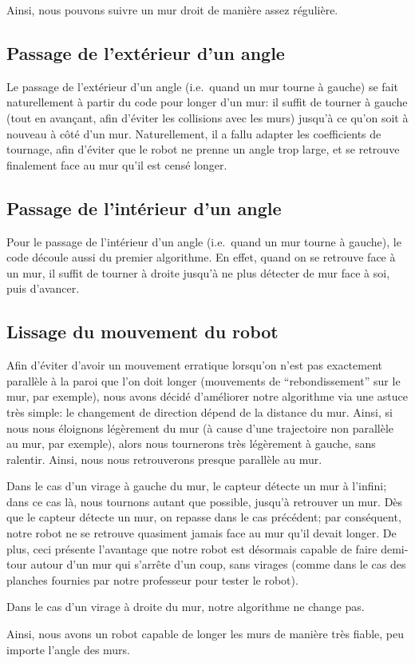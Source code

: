 \documentclass{scrartcl}
\begin{document}
Ainsi, nous pouvons suivre un mur droit de manière assez régulière.

\subsection{Passage de l'extérieur d'un angle}

Le passage de l'extérieur d'un angle (i.e.\ quand un mur tourne à
gauche) se fait naturellement à partir du code pour longer d'un mur:
il suffit de tourner à gauche (tout en avançant, afin d'éviter les
collisions avec les murs) jusqu'à ce qu'on soit à nouveau à côté d'un
mur. Naturellement, il a fallu adapter les coefficients de tournage,
afin d'éviter que le robot ne prenne un angle trop large, et se
retrouve finalement face au mur qu'il est censé longer.

\subsection{Passage de l'intérieur d'un angle}

Pour le passage de l'intérieur d'un angle (i.e.\ quand un mur tourne à
gauche), le code découle aussi du premier algorithme. En effet, quand
on se retrouve face à un mur, il suffit de tourner à droite jusqu'à ne
plus détecter de mur face à soi, puis d'avancer.

\subsection{Lissage du mouvement du robot}

Afin d'éviter d'avoir un mouvement erratique lorsqu'on n'est pas
exactement parallèle à la paroi que l'on doit longer (mouvements de
``rebondissement'' sur le mur, par exemple), nous avons décidé
d'améliorer notre algorithme via une astuce très simple: le changement de
direction dépend de la distance du mur. Ainsi, si nous nous éloignons
légèrement du mur (à cause d'une trajectoire non parallèle au mur, par
exemple), alors nous tournerons très légèrement à gauche, sans
ralentir. Ainsi, nous nous retrouverons presque parallèle au mur.

Dans le cas d'un virage à gauche du mur, le capteur détecte un mur à
l'infini; dans ce cas là, nous tournons autant que possible, jusqu'à
retrouver un mur. Dès que le capteur détecte un mur, on repasse dans
le cas précédent; par conséquent, notre robot ne se retrouve quasiment
jamais face au mur qu'il devait longer. De plus, ceci présente
l'avantage que notre robot est désormais capable de faire demi-tour
autour d'un mur qui s'arrête d'un coup, sans virages (comme dans le
cas des planches fournies par notre professeur pour tester le robot).

Dans le cas d'un virage à droite du mur, notre algorithme ne change
pas.

Ainsi, nous avons un robot capable de longer les murs de manière très
fiable, peu importe l'angle des murs.
\end{document}
